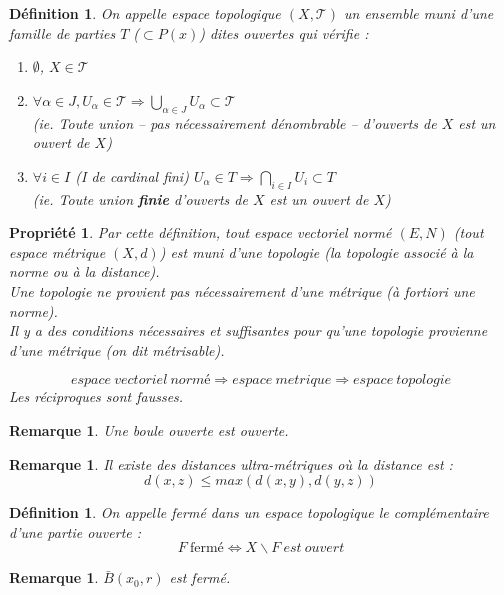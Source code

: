 \documentclass[a4paper, oneside]{report}
\theoremstyle{break}
\newtheorem{defi}[thm]{Définition}
\newtheorem{propr}[thm]{Propriété}
\newtheorem{remar}[thm]{Remarque}
\newcommand{\evn}{espace vectoriel normé }
\begin{document}
\begin{defi}                    
On appelle espace topologique $(X, \mathcal{T})$ un ensemble muni d'une famille de parties $T$ ($\subset P(x)$) dites ouvertes qui vérifie :
\begin{enumerate}
\item $\emptyset$, $X\in \mathcal{T}$
\item $ \forall \alpha\in J, U_\alpha \in \mathcal{T} \Rightarrow \bigcup_{\alpha \in J}U_\alpha \subset \mathcal{T}$ \\
  (ie. Toute union -- pas nécessairement dénombrable -- d'ouverts de $X$ est un ouvert de $X$)
\item $\forall i\in I$ (I de cardinal fini) $U_\alpha\in T \Rightarrow \bigcap_{i\in I}U_i\subset T$ \\
  (ie. Toute union \textbf{finie} d'ouverts de $X$ est un ouvert de $X$)
\end{enumerate}
\end{defi}


\begin{propr}
Par cette définition, tout \evn $(E, N)$ (tout espace métrique $(X,d)$) est muni d'une topologie (la topologie associé à la norme ou à la distance).\\
Une topologie ne provient pas nécessairement d'une métrique (à fortiori une norme).\\
Il y a des conditions nécessaires et suffisantes pour qu'une topologie provienne d'une métrique (on dit métrisable).

$$ espace~vectoriel~normé \Rightarrow espace~metrique \Rightarrow espace~topologie $$
Les réciproques sont fausses.
\end{propr}


\begin{remar}
Une boule ouverte est ouverte.
\end{remar}


\begin{remar}
Il existe des distances ultra-métriques où la distance est :
$$d(x,z)\leq max(d(x,y),d(y,z))$$
\end{remar}


\begin{defi}                    
On appelle fermé dans un espace topologique le complémentaire d'une partie ouverte :
$$F~\text{fermé} \Leftrightarrow X\backslash F~est~ouvert$$
\end{defi}

\begin{remar}
$\bar{B}(x_0,r)$ est fermé.
\end{remar}
\end{document}
